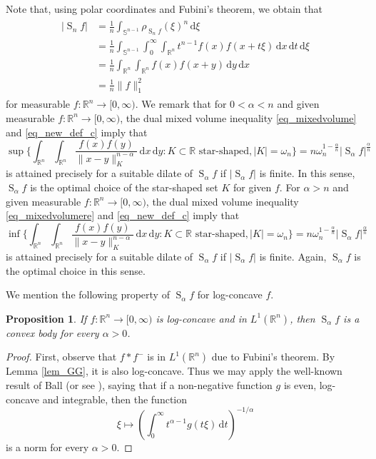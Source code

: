 \documentclass{amsart}
\newtheorem{proposition}[theorem]{Proposition}
\newcommand{\R}{\mathbb R}
\newcommand{\sn}{{\mathbb S}^{n-1}}
\renewcommand{\d}{\,\mathrm{d}}
\newcommand{\vol}[1]{\vert #1\vert}
\newcommand{\hls}[1]{\operatorname{S}_{#1}\!} %
\begin{document}
Note that, using polar coordinates and Fubini's theorem, we obtain that
\begin{align}
\begin{split}\label{eq_hlsn}
    \vol{\hls nf}
    &=\frac 1n \int_{\sn} \rho_{\hls nf}(\xi)^n \d \xi  \\
    &=\frac 1n \int_{\sn} \int_0^\infty \int_{\R^n}t^{n-1} f(x) f(x+t\xi) \d x \d t \d \xi \\
    &=\frac 1n \int_{\R^n} \int_{\R^n} f(x) f(x+y) \d y \d x  \\
    &=\frac 1n \|f\|_1^2
\end{split}
\end{align}
for measurable $f:\R^n\to [0,\infty)$. 
\goodbreak
We remark that for $0< \alpha <n$ and given measurable $f:\R^n\to[0,\infty)$, the dual mixed volume inequality \eqref{eq_mixedvolume}  and \eqref{eq_new_def_c} imply that
\begin{equation}
\sup\big\{ \int_{\R^n}\int_{\R^n} \frac{f(x) f(y)}{\|x-y\|_K^{n-\alpha}}\d x\d y: K\subset \R \text{ star-shaped}, \vol{K}=\omega_n\big\} = n\omega_n^{1-\frac \alpha n} \vol{\hls \alpha f}^\frac{\alpha}n
\end{equation}
is attained precisely for a suitable dilate of $\hls \alpha f$ if $\vol{\hls \alpha f}$ is finite. In this sense, $\hls \alpha f$ is the optimal choice of the star-shaped set $K$ for given $f$. For $\alpha >n$ and given measurable $f:\R^n\to[0,\infty)$, 
the dual mixed volume inequality \eqref{eq_mixedvolumere}  and \eqref{eq_new_def_c} imply that
\begin{equation}
\inf\big\{ \int_{\R^n}\int_{\R^n} \frac{f(x) f(y)}{\|x-y\|_K^{n-\alpha}}\d x\d y: K\subset \R \text{ star-shaped}, \vol{K}=\omega_n\big\} =n\omega_n^{1-\frac \alpha n} \vol{\hls \alpha f}^\frac{\alpha}n
\end{equation}
is attained precisely for a suitable dilate of $\hls \alpha f$ if $\vol{\hls \alpha f}$ is finite. Again, $\hls \alpha f$ is the optimal choice in this sense.

\goodbreak
We mention the following property of $\hls \alpha f$  for log-concave $f$. 


\begin{proposition}\label{prop_convex}
If $f:\R^n\to [0,\infty)$ is log-concave and in $L^1(\R^n)$, then $\hls \alpha f$ is a convex body for every $\alpha>0$.
\end{proposition}

\begin{proof}
First, observe that $f*f^-$ is in $L^1(\R^n)$ due to Fubini's theorem.
By Lemma \ref{lem_GG}, it is also log-concave.
Thus we may apply the well-known result of Ball \cite[Theorem 5]{Ball1988} (or see \cite[Corollary 4.2]{GZ}), saying that if a non-negative function $g$ is even, log-concave and integrable, then the function
\[\xi \mapsto \left(\int_0^\infty t^{\alpha-1} g(t\xi) \d t\right)^{-1/\alpha}\]
is a norm for every $\alpha>0$.
\end{proof}
\end{document}
